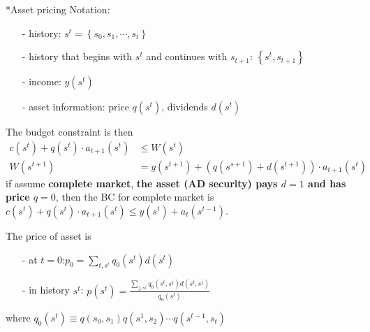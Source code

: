 \documentclass[10pt,landscape,a4paper]{article}
\makeatletter
\renewcommand{\section}{\@startsection{section}{1}{0mm}{1ex}{.2ex}{\normalsize\bfseries}}
\makeatother
\begin{document}
\begin{multicols*}{3}
\section*{Asset pricing}
Notation:
\begin{itemize}
    \item[-] history: $s^t = \left\{s_0,s_1,\cdots,s_t\right\}$
    \item[-] history that begins with $s^t$ and continues with $s_{t+1}$: $\left\{s^t,s_{t+1}\right\}$
    \item[-] income: $y(s^t)$
    \item[-] asset information: price $q(s^t)$, dividends $d(s^t)$
\end{itemize}
The budget constraint is then
\begin{align*}
    c(s^t)+q(s^t)\cdot a_{t+1}(s^t) &\leq W(s^t)\\
    W(s^{t+1}) &= y(s^{t+1})+\left( q(s^{s+1}) + d(s^{t+1}) \right)\cdot a_{t+1}(s^t)
\end{align*}
if assume \textbf{\color{myred}complete market}, \textbf{the asset (AD security) pays $d=1$ and has price $q=0$}, then the BC for complete market is $c(s^t)+q(s^t)\cdot a_{t+1}(s^t) \leq y(s^t)+a_t(s^{t-1})$.

The price of asset is 
\begin{itemize}
    \item[-] at $t=0$:$p_0 = \sum_{t,s^t}q_0(s^t)d(s^t)$
    \item[-] in history $s^t$: $p(s^t) = \frac{\sum_{j,s^j}q_0(s^t,s^j)d(s^t,s^j)}{q_0(s^t)}$
\end{itemize}
where $q_0(s^t) \equiv q(s_0,s_1)q(s^1,s_2)\cdots q(s^{t-1},s_t)$


\end{multicols*}
\end{document}
